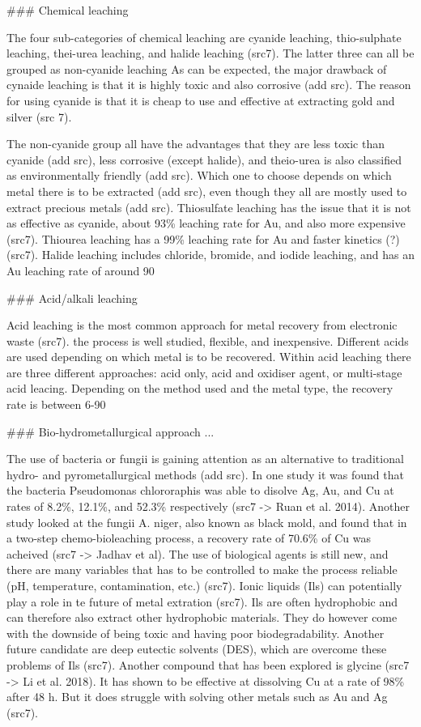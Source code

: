 ### Chemical leaching

The four sub-categories of chemical leaching are cyanide leaching, thio-sulphate leaching, thei-urea leaching, and halide leaching (src7). The latter three can all be grouped as non-cyanide leaching As can be expected, the major drawback of cynaide leaching is that it is highly toxic and also corrosive (add src). The reason for using cyanide is that it is cheap to use and effective at extracting gold and silver (src 7).

The non-cyanide group all have the advantages that they are less toxic than cyanide (add src), less corrosive (except halide), and theio-urea is also classified as environmentally friendly (add src). Which one to choose depends on which metal there is to be extracted (add src), even though they all are mostly used to extract precious metals (add src). Thiosulfate leaching has the issue that it is not as effective as cyanide, about 93\% leaching rate for Au, and also more expensive (src7). Thiourea leaching has a 99\% leaching rate for Au and faster kinetics (?) (src7). Halide leaching includes chloride, bromide, and iodide leaching, and has an Au leaching rate of around 90%

### Acid/alkali leaching

Acid leaching is the most common approach for metal recovery from electronic waste (src7). the process is well studied, flexible, and inexpensive. Different acids are used depending on which metal is to be recovered. Within acid leaching there are three different approaches: acid only, acid and oxidiser agent, or multi-stage acid leacing. Depending on the method used and the metal type, the recovery rate is between 6-90%

### Bio-hydrometallurgical approach ...

The use of bacteria or fungii is gaining attention as an alternative to traditional hydro- and pyrometallurgical methods (add src). In one study it was found that the bacteria Pseudomonas chlororaphis was able to disolve Ag, Au, and Cu at rates of 8.2\%, 12.1\%, and 52.3\% respectively (src7 -> Ruan et al. 2014). Another study looked at the fungii A. niger, also known as black mold, and found that in a two-step chemo-bioleaching process, a recovery rate of 70.6\% of Cu was acheived (src7 -> Jadhav et al). The use of biological agents is still new, and there are many variables that has to be controlled to make the process reliable (pH, temperature, contamination, etc.) (src7). Ionic liquids (Ils) can potentially play a role in te future of metal extration (src7). Ils are often hydrophobic and can therefore also extract other hydrophobic materials. They do however come with the downside of being toxic and having poor biodegradability. Another future candidate are deep eutectic solvents (DES), which are overcome these problems of Ils (src7). Another compound that has been explored is glycine (src7 -> Li et al. 2018). It has shown to be effective at dissolving Cu at a rate of 98\% after 48 h. But it does struggle with solving other metals such as Au and Ag (src7).

